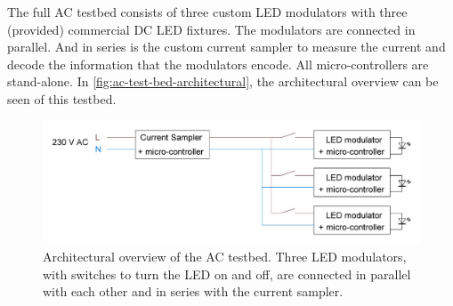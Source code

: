The full AC testbed consists of three custom LED modulators with three (provided) commercial DC LED fixtures.
The modulators are connected in parallel. 
And in series is the custom current sampler to measure the current and decode the information that the modulators encode.
All micro-controllers are stand-alone.
In \autoref{fig:ac-test-bed-architectural}, the architectural overview can be seen of this testbed.

\begin{figure}[htb]
	\centering
	\includegraphics[angle=0,width=\textwidth,keepaspectratio]{chapters/hardware-chapters/ac-test-bed-architectural.JPG}
	\caption{Architectural overview of the AC testbed. Three LED modulators, with switches to turn the LED on and off, are connected in parallel with each other and in series with the current sampler.}
	\label{fig:ac-test-bed-architectural}
\end{figure}



